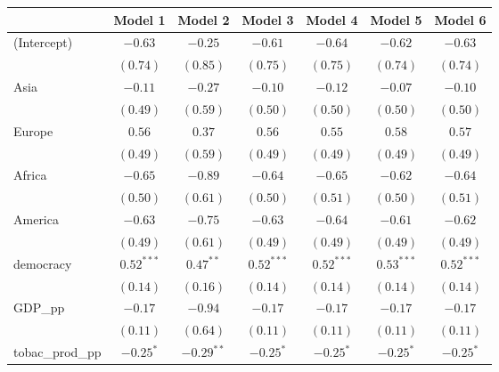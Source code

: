 
\begin{table}[!h]
\begin{center}
\begin{tabular}{l c c c c c c }
\toprule
 & Model 1 & Model 2 & Model 3 & Model 4 & Model 5 & Model 6 \\
\midrule
(Intercept)             & $-0.63$      & $-0.25$      & $-0.61$      & $-0.64$      & $-0.62$      & $-0.63$      \\
                        & $(0.74)$     & $(0.85)$     & $(0.75)$     & $(0.75)$     & $(0.74)$     & $(0.74)$     \\
Asia                    & $-0.11$      & $-0.27$      & $-0.10$      & $-0.12$      & $-0.07$      & $-0.10$      \\
                        & $(0.49)$     & $(0.59)$     & $(0.50)$     & $(0.50)$     & $(0.50)$     & $(0.50)$     \\
Europe                  & $0.56$       & $0.37$       & $0.56$       & $0.55$       & $0.58$       & $0.57$       \\
                        & $(0.49)$     & $(0.59)$     & $(0.49)$     & $(0.49)$     & $(0.49)$     & $(0.49)$     \\
Africa                  & $-0.65$      & $-0.89$      & $-0.64$      & $-0.65$      & $-0.62$      & $-0.64$      \\
                        & $(0.50)$     & $(0.61)$     & $(0.50)$     & $(0.51)$     & $(0.50)$     & $(0.51)$     \\
America                 & $-0.63$      & $-0.75$      & $-0.63$      & $-0.64$      & $-0.61$      & $-0.62$      \\
                        & $(0.49)$     & $(0.61)$     & $(0.49)$     & $(0.49)$     & $(0.49)$     & $(0.49)$     \\
democracy               & $0.52^{***}$ & $0.47^{**}$  & $0.52^{***}$ & $0.52^{***}$ & $0.53^{***}$ & $0.52^{***}$ \\
                        & $(0.14)$     & $(0.16)$     & $(0.14)$     & $(0.14)$     & $(0.14)$     & $(0.14)$     \\
GDP\_pp                 & $-0.17$      & $-0.94$      & $-0.17$      & $-0.17$      & $-0.17$      & $-0.17$      \\
                        & $(0.11)$     & $(0.64)$     & $(0.11)$     & $(0.11)$     & $(0.11)$     & $(0.11)$     \\
tobac\_prod\_pp         & $-0.25^{*}$  & $-0.29^{**}$ & $-0.25^{*}$  & $-0.25^{*}$  & $-0.25^{*}$  & $-0.25^{*}$  \\

\end{tabular}
\end{center}
\end{table}
